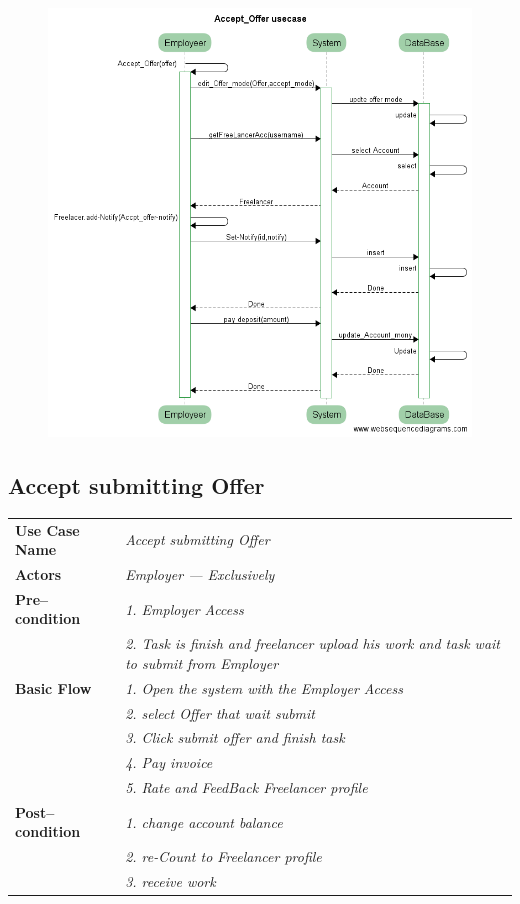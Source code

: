 \documentclass{article}
\begin{document}
\begin{figure}[ht!]
\centering
\includegraphics[width=128mm]{Accept_Offer_usecase.png}
\end{figure}

\newpage
\subsection{Accept submitting Offer}
    \begin{tabular}{ l | l }
    \toprule
      \rowcolor{LightCyan}
      \textbf{Use Case Name}    & \textit{Accept submitting Offer}\\
      \textbf{Actors}           & \textit{Employer --- Exclusively}\\
      \rowcolor{LightCyan}
      \textbf{Pre--condition}   & \textit{1. Employer Access}\\
                                & \textit{2. Task is finish and freelancer upload his work and task wait to submit from Employer}\\
      \textbf{Basic Flow}       & \textit{1. Open the system with the Employer Access}\\
                                & \textit{2. select Offer that wait submit}\\
                                & \textit{3. Click submit offer and finish task}\\
                                & \textit{4. Pay invoice}\\
				& \textit{5. Rate and FeedBack Freelancer profile}\\
      \rowcolor{LightCyan}
      \textbf{Post--condition}  & \textit{1. change account balance}\\
                                & \textit{2. re-Count to Freelancer profile}\\
                                & \textit{3. receive work}\\
    \toprule
    \end{tabular}
\end{document}
